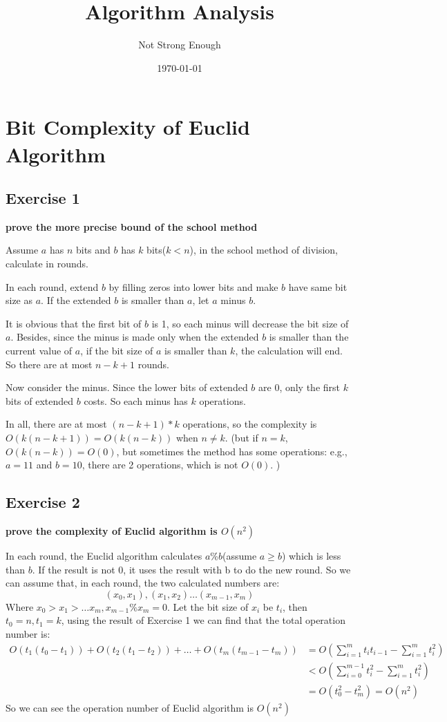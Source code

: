 \documentclass[UTF8, a4paper, linespread=1.5]{article}
\title{Algorithm Analysis}
\date{\today}
\author{Not Strong Enough}
\begin{document}
\maketitle

\section{Bit Complexity of Euclid Algorithm}

\subsection{Exercise 1}

{\bfseries prove the more precise bound of the school method}

Assume $a$ has $n$ bits and $b$ has $k$ bits($k < n$), in the school method of division, 
calculate in rounds. 

In each round, extend $b$ by filling zeros into lower bits and make $b$ have same bit size as $a$. 
If the extended $b$ is smaller than $a$, let $a$ minus $b$. 

It is obvious that the first bit of $b$ is 1, so each minus will decrease the bit size of $a$. 
Besides, since the minus is made only when the extended $b$ is smaller than the current value of $a$, 
if the bit size of $a$ is smaller than $k$, the calculation will end. 
So there are at most $n-k+1$ rounds. 

Now consider the minus. Since the lower bits of extended $b$ are 0, only the first $k$ bits of extended $b$ 
costs. So each minus has $k$ operations. 

In all, there are at most $(n-k+1)*k$ operations, so the complexity is $O(k(n-k+1))=O(k(n-k))$ when $n\neq k$. 
(but if $n=k$, $O(k(n-k))=O(0)$, but sometimes the method has some operations: e.g., $a=11$ and $b=10$, 
there are 2 operations, which is not $O(0)$. )

\subsection{Exercise 2}

{\bfseries prove the complexity of Euclid algorithm is $O(n^2)$}

In each round, the Euclid algorithm calculates $a\%b$(assume $a\geq b$) which is less than $b$. 
If the result is not 0, it uses the result with b to do the new round. So we can assume that, in each round, 
the two calculated numbers are: 
$$(x_0, x_1), (x_1, x_2)\dots (x_{m-1}, x_m)$$
Where $x_0>x_1>\dots x_m, x_{m-1}\%x_m=0$. 
Let the bit size of $x_i$ be $t_i$, then $t_0=n, t_1=k$, 
using the result of Exercise 1 we can find that the total operation number is: 
\begin{align}
O(t_1(t_0-t_1))+O(t_2(t_1-t_2))+\dots + O(t_m(t_{m-1}-t_m)) &=O(\sum_{i=1}^m t_i t_{i-1}-\sum_{i=1}^m t_i^2)\\
&<O(\sum_{i=0}^{m-1} t_i^2 -\sum_{i=1}^m t_i^2)\\
&=O(t_0^2-t_m^2)=O(n^2)
\end{align}
So we can see the operation number of Euclid algorithm is $O(n^2)$
\end{document}
